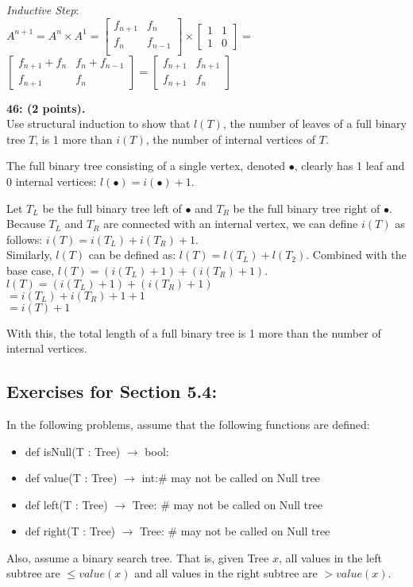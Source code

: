 \documentclass[12pt]{article}  %
\begin{document}
\noindent
\textit{Inductive Step}:\\
$A^{n+1}=A^n\times A^{1}=\begin{bmatrix}
    f_{n+1} & f_{n}   \\
    f_{n}   & f_{n-1} \\
\end{bmatrix}\times\begin{bmatrix}
    1 & 1 \\
    1 & 0
\end{bmatrix}=$\\
$\begin{bmatrix}
    f_{n+1}+f_{n} & f_n+f_{n-1} \\
    f_{n+1}       & f_n
\end{bmatrix}=\begin{bmatrix}
    f_{n+1} & f_{n+1} \\
    f_{n+1} & f_n
\end{bmatrix}$

\noindent
{\bf 46: (2 points).}\\
Use structural induction to show that $l(T)$, the number of leaves of a full binary tree $T$, is 1 more than $i(T)$, the number of internal vertices of $T$.

\noindent
The full binary tree consisting of a single vertex, denoted $\bullet$, clearly has 1 leaf and 0 internal vertices: $l(\bullet)=i(\bullet)+1$.

\noindent
Let $T_L$ be the full binary tree left of $\bullet$ and $T_R$ be the full binary tree right of $\bullet$.\\
Because $T_L$ and $T_R$ are connected with an internal vertex, we can define $i(T)$ as follows: $i(T)=i(T_L)+i(T_R)+1$.\\
Similarly, $l(T)$ can be defined as: $l(T)=l(T_L)+l(T_2)$. Combined with the base case, $l(T)=(i(T_L)+1)+(i(T_R)+1)$.\\
$l(T)=(i(T_L)+1)+(i(T_R)+1)$\\
$=i(T_L)+i(T_R)+1+1$\\
$=i(T)+1$

\noindent
With this, the total length of a full binary tree is 1 more than the number of internal vertices.

\subsection*{Exercises for Section 5.4:}     

In the following problems, assume that the following functions are defined:
\begin{itemize}
\item def isNull(T : Tree)  $\rightarrow$ bool:
\item def value(T : Tree)  $\rightarrow$ int:\# may not be called on Null tree
\item def left(T : Tree) $\rightarrow$ Tree: \# may not be called on Null tree
\item def right(T : Tree) $\rightarrow$ Tree: \# may not be called on Null tree
\end{itemize}
Also, assume a binary search tree. That is, given Tree $x$, all values in the left subtree are $\leq value(x)$ and all values in the right subtree are $> value(x)$.
\end{document}
